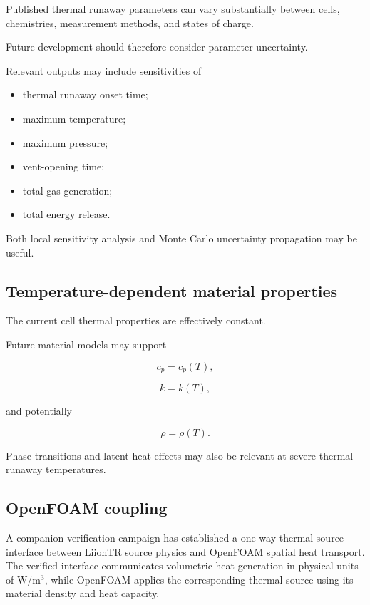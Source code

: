 Published thermal runaway parameters can vary substantially between
cells, chemistries, measurement methods, and states of charge.

Future development should therefore consider parameter uncertainty.

Relevant outputs may include sensitivities of

\begin{itemize}
    \item thermal runaway onset time;
    \item maximum temperature;
    \item maximum pressure;
    \item vent-opening time;
    \item total gas generation;
    \item total energy release.
\end{itemize}

Both local sensitivity analysis and Monte Carlo uncertainty propagation
may be useful.


\subsection{Temperature-dependent material properties}

The current cell thermal properties are effectively constant.

Future material models may support

\begin{equation}
    c_p
    =
    c_p(T),
\end{equation}

\begin{equation}
    k
    =
    k(T),
\end{equation}

and potentially

\begin{equation}
    \rho
    =
    \rho(T).
\end{equation}

Phase transitions and latent-heat effects may also be relevant at severe
thermal runaway temperatures.


\subsection{OpenFOAM coupling}

A companion verification campaign has established a one-way thermal-source
interface between LiionTR source physics and OpenFOAM spatial heat transport.
The verified interface communicates volumetric heat generation in physical
units of W/m$^3$, while OpenFOAM applies the corresponding thermal source using
its material density and heat capacity.


